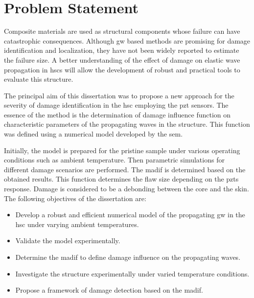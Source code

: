 

\chapter[Problem Statement]{Problem Statement}
\label{ch:problem}



Composite materials are used as structural components whose failure can have catastrophic consequences.
Although \ac{gw} based methods are promising for damage identification and localization, they have not been widely reported to estimate the failure size.
A better understanding of the effect of damage on elastic wave propagation in \acp{hsc} will allow the development of robust and practical tools to evaluate this structure.

The principal aim of this dissertation was to propose a new approach for the severity of damage identification in the \ac{hsc} employing the \ac{pzt} sensors.
The essence of the method is the determination of damage influence function on characteristic parameters of the propagating waves in the structure.
This function was defined using a numerical model developed by the \ac{sem}.

Initially, the model is prepared for the pristine sample under various operating conditions such as ambient temperature.
Then parametric simulations for different damage scenarios are performed.
The \ac{madif} is determined based on the obtained results. 
This function determines the flaw size depending on the \acp{pzt} response.
Damage is considered to be a debonding between the core and the skin. 
The following objectives of the dissertation are:
\begin{itemize}
	\item Develop a robust and efficient numerical model of the propagating \ac{gw} in the \ac{hsc} under varying ambient temperatures.
	\item Validate the model experimentally.
	\item Determine the \ac{madif} to define damage influence on the propagating waves.
	\item Investigate the structure experimentally under varied temperature conditions.
	\item Propose a framework of damage detection based on the \ac{madif}.
\end{itemize}


